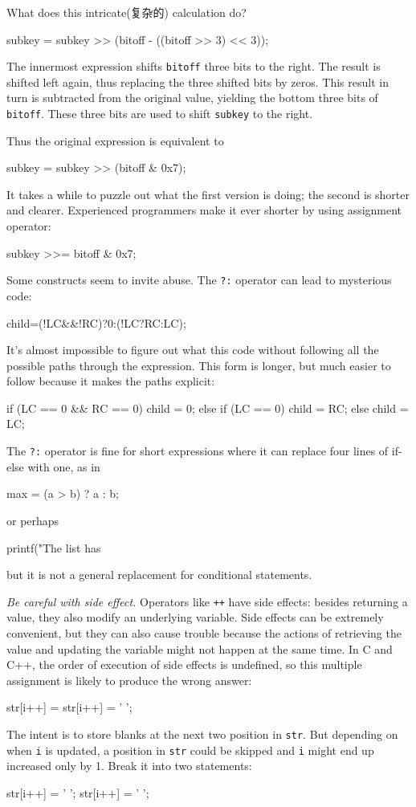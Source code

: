 What does this intricate(复杂的) calculation do?
\begin{badcode}
    subkey = subkey >> (bitoff - ((bitoff >> 3) << 3));
\end{badcode}
The innermost expression shifts \verb"bitoff" three bits to the right. The
result is shifted left again, thus replacing the three shifted bits by
zeros. This result in turn is subtracted from the original value, yielding
the bottom three bits of \verb"bitoff". These three bits are used to shift
\verb'subkey' to the right.

Thus the original expression is equivalent to 
\begin{wellcode}
    subkey = subkey >> (bitoff & 0x7);
\end{wellcode}
It takes a while to puzzle out what the first version is doing; the second
is shorter and clearer. Experienced programmers make it ever shorter by
using assignment operator:
\begin{wellcode}
    subkey >>= bitoff & 0x7;
\end{wellcode}
Some constructs seem to invite abuse. The \verb"?:" operator can lead to
mysterious code:
\begin{badcode}
    child=(!LC&&!RC)?0:(!LC?RC:LC);
\end{badcode}
It's almost impossible to figure out what this code without following all
the possible paths through the expression. This form is longer, but much
easier to follow because it makes the paths explicit:
\begin{wellcode}
    if (LC == 0 && RC == 0)
        child = 0;
    else if (LC == 0)
        child = RC;
    else
        child = LC;
\end{wellcode}
The \verb'?:' operator is fine for short expressions where it can replace
four lines of if-else with one, as in
\begin{wellcode}
    max = (a > b) ? a : b;
\end{wellcode}
or perhaps
\begin{wellcode}
    printf("The list has %
\end{wellcode}
but it is not a general replacement for conditional statements.

\emph{Be careful with side effect.} Operators like \verb'++' have side
effects: besides returning a value, they also modify an underlying
variable. Side effects can be extremely convenient, but they can also cause
trouble because the actions of retrieving the value and updating the
variable might not happen at the same time. In C and C++, the order of
execution of side effects is undefined, so this multiple assignment is
likely to produce the wrong answer:
\begin{badcode}
    str[i++] = str[i++] = ' ';
\end{badcode}
The intent is to store blanks at the next two position in \verb'str'. But
depending on when \verb'i' is updated, a position in \verb'str' could be
skipped and \verb'i' might end up increased only by 1. Break it into two
statements:
\begin{wellcode}
    str[i++] = ' ';
    str[i++] = ' ';
\end{wellcode}

